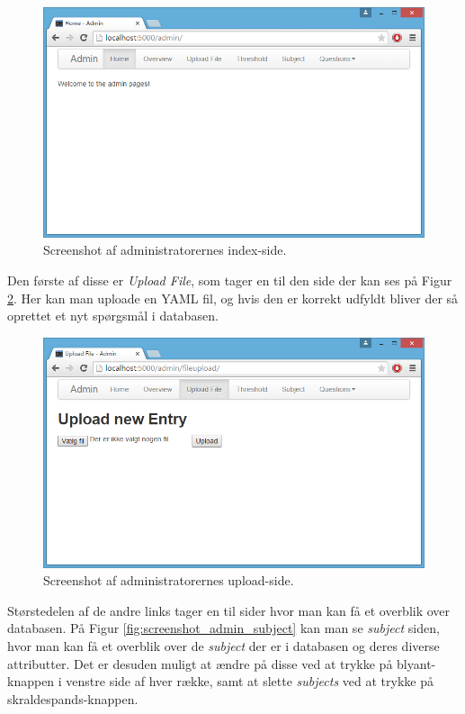 \documentclass[11pt, a4paper]{article}
\begin{document}
\begin{figure}[htpb]
    \centering
    \includegraphics[width=1\linewidth]{figures/interface/admin_home.png}
    \caption{Screenshot af administratorernes index-side.}
    \label{fig:screenshot_admin_home}
\end{figure}

Den første af disse er \emph{Upload File}, som tager en til den side der kan ses på Figur \ref{fig:screenshot_admin_upload}. Her kan man uploade en YAML fil, og hvis den er korrekt udfyldt bliver der så oprettet et nyt spørgsmål i databasen.

\begin{figure}[htpb]
    \centering
    \includegraphics[width=1\linewidth]{figures/interface/admin_upload.png}
    \caption{Screenshot af administratorernes upload-side.}
    \label{fig:screenshot_admin_upload}
\end{figure}

Størstedelen af de andre links tager en til sider hvor man kan få et overblik over databasen. På Figur \ref{fig:screenshot_admin_subject} kan man se \emph{subject} siden, hvor man kan få et overblik over de \emph{subject} der er i databasen og deres diverse attributter. Det er desuden muligt at ændre på disse ved at trykke på blyant-knappen i venstre side af hver række, samt at slette \emph{subjects} ved at trykke på skraldespands-knappen.
\end{document}
